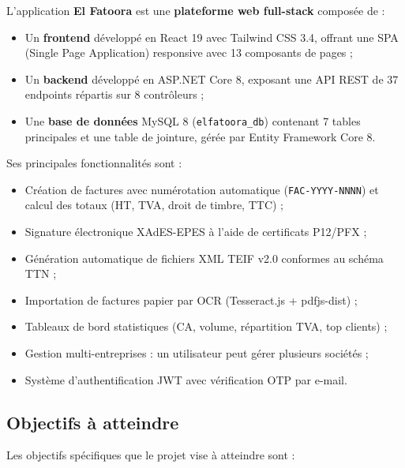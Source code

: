 \documentclass[a4paper,12pt]{report}
\newcommand{\elfattoora}{\textbf{El Fatoora}}
\begin{document}
L'application \elfattoora{} est une \textbf{plateforme web full-stack} composée de :
\begin{itemize}
    \item Un \textbf{frontend} développé en React 19 avec Tailwind CSS 3.4, offrant une SPA (Single Page Application) responsive avec 13 composants de pages ;
    \item Un \textbf{backend} développé en ASP.NET Core 8, exposant une API REST de 37 endpoints répartis sur 8 contrôleurs ;
    \item Une \textbf{base de données} MySQL 8 (\texttt{elfatoora\_db}) contenant 7 tables principales et une table de jointure, gérée par Entity Framework Core 8.
\end{itemize}

Ses principales fonctionnalités sont :
\begin{itemize}[nosep]
    \item Création de factures avec numérotation automatique (\texttt{FAC-YYYY-NNNN}) et calcul des totaux (HT, TVA, droit de timbre, TTC) ;
    \item Signature électronique XAdES-EPES à l'aide de certificats P12/PFX ;
    \item Génération automatique de fichiers XML TEIF v2.0 conformes au schéma TTN ;
    \item Importation de factures papier par OCR (Tesseract.js + pdfjs-dist) ;
    \item Tableaux de bord statistiques (CA, volume, répartition TVA, top clients) ;
    \item Gestion multi-entreprises : un utilisateur peut gérer plusieurs sociétés ;
    \item Système d'authentification JWT avec vérification OTP par e-mail.
\end{itemize}

\subsection{Objectifs à atteindre}

Les objectifs spécifiques que le projet vise à atteindre sont :
\end{document}

